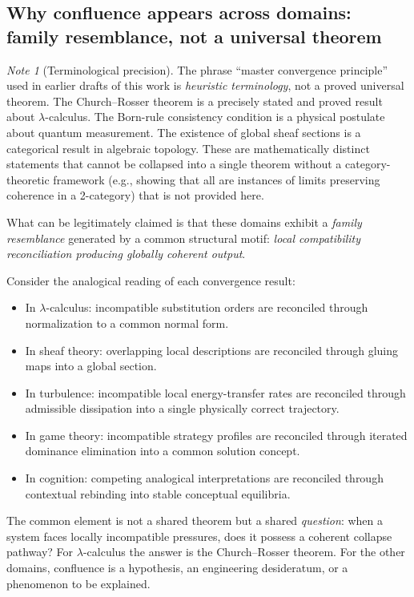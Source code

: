 \documentclass[12pt, a4paper]{article}
\theoremstyle{plain}
\theoremstyle{definition}
\theoremstyle{remark}
\newtheorem{note}[theorem]{Note}
\begin{document}
\subsection{Why confluence appears across domains: family resemblance,
  not a universal theorem}

\begin{note}[Terminological precision]
  The phrase ``master convergence principle'' used in earlier drafts
  of this work is \emph{heuristic terminology}, not a proved universal
  theorem.
  The Church--Rosser theorem is a precisely stated and proved result
  about $\lambda$-calculus.
  The Born-rule consistency condition is a physical postulate about
  quantum measurement.
  The existence of global sheaf sections is a categorical result in
  algebraic topology.
  These are mathematically distinct statements that cannot be collapsed
  into a single theorem without a category-theoretic framework
  (e.g., showing that all are instances of limits preserving coherence
  in a 2-category) that is not provided here.
\end{note}

What can be legitimately claimed is that these domains exhibit a
\emph{family resemblance} generated by a common structural motif:
\emph{local compatibility reconciliation producing globally coherent
output}.

Consider the analogical reading of each convergence result:
\begin{itemize}
  \item In $\lambda$-calculus: incompatible substitution orders are
        reconciled through normalization to a common normal form.
  \item In sheaf theory: overlapping local descriptions are reconciled
        through gluing maps into a global section.
  \item In turbulence: incompatible local energy-transfer rates are
        reconciled through admissible dissipation into a single
        physically correct trajectory.
  \item In game theory: incompatible strategy profiles are reconciled
        through iterated dominance elimination into a common solution
        concept.
  \item In cognition: competing analogical interpretations are
        reconciled through contextual rebinding into stable conceptual
        equilibria.
\end{itemize}

The common element is not a shared theorem but a shared \emph{question}:
when a system faces locally incompatible pressures, does it possess a
coherent collapse pathway?
For $\lambda$-calculus the answer is the Church--Rosser theorem.
For the other domains, confluence is a hypothesis, an engineering
desideratum, or a phenomenon to be explained.
\end{document}
